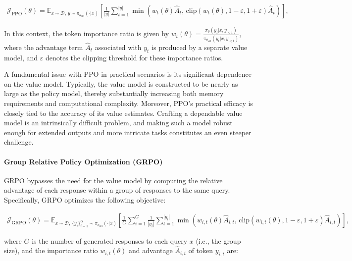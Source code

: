 \begin{align}
\mathcal{J}_\text{PPO}(\theta) = \mathbb{E}_{ x \sim \mathcal{D},\, y \sim \pi_{\theta_\text{old}}( \cdot | x) }
\left[ \frac{1}{|y|} \sum_{t=1}^{|y|} 
\min \left( w_{t}(\theta) \widehat{A}_{t},  \, \mathrm{clip} \left( w_{t}(\theta), 1 - {\varepsilon}, 1 + {\varepsilon}\right) \widehat{A}_{t} \right)
\right],
\end{align}

In this context, the token importance ratio is given by $
w_{t}(\theta) = \frac{ \pi_{\theta} (y_{t} | x, y_{<t}) }{ \pi_{\theta_\text{old}} (y_{t} | x,y_{<t})} $, where the advantage term $\widehat{A}_{t}$ associated with $y_t$ is produced by a separate value model, and $\varepsilon$ denotes the clipping threshold for these importance ratios.

A fundamental issue with PPO in practical scenarios is its significant dependence on the value model. Typically, the value model is constructed to be nearly as large as the policy model, thereby substantially increasing both memory requirements and computational complexity. Moreover, PPO’s practical efficacy is closely tied to the accuracy of its value estimates. Crafting a dependable value model is an intrinsically difficult problem, and making such a model robust enough for extended outputs and more intricate tasks constitutes an even steeper challenge.

\paragraph{Group Relative Policy Optimization (GRPO)} GRPO \citep{grpo} bypasses the need for the value model by computing the relative advantage of each response within a group of responses to the same query. Specifically, GRPO optimizes the following objective:

\begin{align}
\label{equ:grpo}
\mathcal{J}_\text{GRPO}(\theta) = \mathbb{E}_{ x \sim \mathcal{D},\, \{y_i\}_{i=1}^G \sim \pi_{\theta_\text{old}}( \cdot | x) }
\left[ \frac{1}{G} \sum_{i=1}^{G} \frac{1}{|y_i|} \sum_{t=1}^{|y_i|} 
\min \left( w_{i,t}(\theta) \widehat{A}_{i,t},  \, \mathrm{clip} \left( w_{i,t}(\theta), 1 - {\varepsilon}, 1 + {\varepsilon}\right) \widehat{A}_{i,t} \right)
\right],
\end{align}

where $G$ is the number of generated responses to each query $x$ (i.e., the group size), and the importance ratio $w_{i,t}(\theta)$ and advantage $\widehat{A}_{i,t}$ of token $y_{i,t}$ are:

